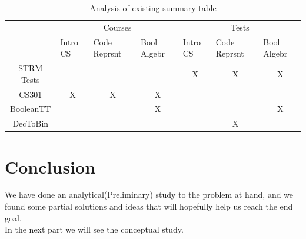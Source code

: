 \begin{table}[h!]
\begin{center}
		\begin{tabular}{c|lll|lcl|}
		\cline{2-7}
		\multicolumn{1}{l|}{}                   & \multicolumn{3}{c|}{Courses}                                                                                                                     & \multicolumn{3}{c|}{Tests}                                                                                                                       \\ \cline{2-7} 
		\multicolumn{1}{l|}{\multirow{-2}{*}{}} & \multicolumn{1}{l|}{Intro CS}                  & \multicolumn{1}{l|}{Code Reprsnt}              & Bool Algebr                                    & \multicolumn{1}{l|}{Intro CS}                  & \multicolumn{1}{l|}{Code Reprsnt}              & Bool Algebr                                    \\ \hline
		\multicolumn{1}{|c|}{STRM Tests}        & \multicolumn{1}{l|}{}                          & \multicolumn{1}{l|}{}                          &                                                & \multicolumn{1}{c|}{\cellcolor[HTML]{96FFFB}X} & \multicolumn{1}{c|}{\cellcolor[HTML]{96FFFB}X} & \multicolumn{1}{c|}{\cellcolor[HTML]{96FFFB}X} \\ \hline
		\multicolumn{1}{|c|}{CS301}             & \multicolumn{1}{c|}{\cellcolor[HTML]{96FFFB}X} & \multicolumn{1}{c|}{\cellcolor[HTML]{96FFFB}X} & \multicolumn{1}{c|}{\cellcolor[HTML]{96FFFB}X} & \multicolumn{1}{l|}{}                          & \multicolumn{1}{l|}{}                          &                                                \\ \hline
		\multicolumn{1}{|c|}{BooleanTT}         & \multicolumn{1}{l|}{}                          & \multicolumn{1}{l|}{}                          & \multicolumn{1}{c|}{\cellcolor[HTML]{96FFFB}X} & \multicolumn{1}{l|}{}                          & \multicolumn{1}{c|}{\cellcolor[HTML]{FFFFFF}}  & \multicolumn{1}{c|}{\cellcolor[HTML]{96FFFB}X} \\ \hline
		\multicolumn{1}{|c|}{DecToBin}          & \multicolumn{1}{l|}{}                          & \multicolumn{1}{l|}{}                          &                                                & \multicolumn{1}{l|}{}                          & \multicolumn{1}{c|}{\cellcolor[HTML]{96FFFB}X} &                                                \\ \hline
		\end{tabular}
\end{center}
\caption{Analysis of existing summary table}
\label{tab:AnalysisOfExistingSummaryTable}
\end{table}


\section{Conclusion}
We have done an analytical(Preliminary) study to the problem at hand, 
and we found some partial solutions and ideas that will hopefully help us reach the end goal. \\
In the next part we will see the conceptual study.
